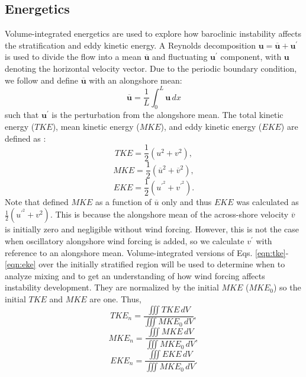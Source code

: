 \subsection{Energetics}
Volume-integrated energetics are used to explore how baroclinic instability affects the stratification and eddy kinetic energy. A Reynolds decomposition $\mathbf{u}=\overline{\mathbf{u}}+\mathbf{u}^\prime$ is used to divide the flow into a mean $\overline{\mathbf{u}}$ and fluctuating $\mathbf{u}^\prime$ component, with $\mathbf{u}$ denoting the horizontal velocity vector. Due to the periodic boundary condition, we follow \citet{Hetland_2017} and define $\overline{\mathbf{u}}$ with an alongshore mean:
\begin{equation}
    \overline{\mathbf{u}}=\frac{1}{L} \int_0^L \mathbf{u} \, dx
\end{equation}
such that $\mathbf{u}^\prime$ is the perturbation from the alongshore mean. The total kinetic energy ($TKE$), mean kinetic energy ($MKE$), and eddy kinetic energy ($EKE$) are defined as \cite{cushman2011introduction}:
\begin{equation} \label{eqn:tke}
    TKE = \frac{1}{2}(u^2+v^2) ,
\end{equation}
\begin{equation} \label{eqn:mke}
    MKE = \frac{1}{2}(\overline{u}^2+\overline{v}^2) ,
\end{equation}
\begin{equation} \label{eqn:eke}
    EKE = \frac{1}{2}(u^{\prime^2}+v^{\prime^2}) .
\end{equation}
Note that \citet{Hetland_2017} defined $MKE$ as a function of $\overline{u}$ only and thus $EKE$ was calculated as $\frac{1}{2}(u^{\prime^2}+v^{2})$. This is because the alongshore mean of the across-shore velocity $\overline{v}$ is initially zero and negligible without wind forcing. However, this is not the case when oscillatory alongshore wind forcing is added, so we calculate $v^\prime$ with reference to an alongshore mean. Volume-integrated versions of Eqs. \ref{eqn:tke}-\ref{eqn:eke} over the initially stratified region will be used to determine when to analyze mixing and to get an understanding of how wind forcing affects instability development. They are normalized by the initial $MKE$ ($MKE_0$) so the initial $TKE$ and $MKE$ are one. Thus, 
\begin{equation}
    TKE_n = \frac{\iiint TKE \, dV}{\iiint MKE_0 \, dV},
\end{equation}
\begin{equation}
    MKE_n = \frac{\iiint M
    KE \, dV}{\iiint MKE_0 \, dV},
\end{equation}
\begin{equation}
    EKE_n = \frac{\iiint EKE \, dV}{\iiint MKE_0 \, dV}.
\end{equation}

